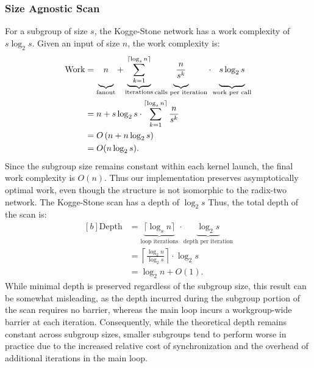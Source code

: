 \documentclass[sigconf]{acmart}
\begin{document}
\subsubsection{Size Agnostic Scan}
For a subgroup of size $s$, the Kogge-Stone network has a work complexity of $s \log_2 s$. Given an input of size $n$, the work complexity is:
\begin{equation}
  \begin{aligned}[b]
    \text{Work} & = \underbrace{\vphantom{\sum_{k=0}^{\lceil \log_s n \rceil}}n}_{\text{fanout}}
    +
    \underbrace{\sum_{k=1}^{\lceil \log_s n \rceil}}_{\text{iterations}}
    \underbrace{\vphantom{\sum_{k=1}^{\lceil \log_s n \rceil}}\frac{n}{s^k}}_{\text{calls per iteration}}
    \cdot
    \underbrace{\vphantom{\sum_{k=1}^{\lceil \log_s n \rceil}}s \log_2 s}_{\text{work per call}} \\
                & = n + s \log_2 s \cdot \sum_{k=1}^{\lceil \log_s n \rceil} \frac{n}{s^k}       \\
                & = O\left(n + n \log_2 s\right)                                                 \\
                & = O(n \log_2 s).
  \end{aligned}
\end{equation}
Since the subgroup size remains constant within each kernel launch, the final work complexity is $O(n)$. Thus our implementation preserves asymptotically optimal work, even though the structure is not isomorphic to the radix-two network. The Kogge-Stone scan has a depth of $\log_2 s$ Thus, the total depth of the scan is:
\begin{equation}
  \begin{aligned}[b]
    \text{Depth} & = \underbrace{\lceil \log_s n \rceil}_{\text{loop iterations}}
    \cdot \underbrace{\log_2 s}_{\text{depth per iteration}}                           \\
                 & = \left\lceil \frac{\log_2 n}{\log_2 s} \right\rceil \cdot \log_2 s \\
                 & = \log_2 n + O(1).
  \end{aligned}
\end{equation}
While minimal depth is preserved regardless of the subgroup size, this result can be somewhat misleading, as the depth incurred during the subgroup portion of the scan requires no barrier, whereas the main loop incurs a workgroup-wide barrier at each iteration. Consequently, while the theoretical depth remains constant across subgroup sizes, smaller subgroups tend to perform worse in practice due to the increased relative cost of synchronization and the overhead of additional iterations in the main loop.
\end{document}
